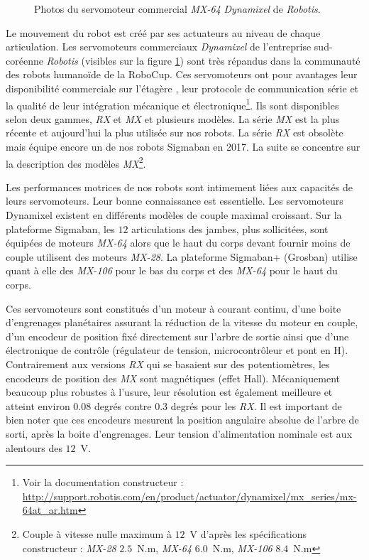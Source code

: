 \begin{figure}[htb]
\begin{subfigure}{0.3\paperwidth}
    \end{subfigure}
    \caption{\label{fig:robot_dynamixel} 
        Photos du servomoteur commercial \textit{MX-64} 
        \textit{Dynamixel} de \textit{Robotis}.
    }
\end{figure}

Le mouvement du robot est créé par ses actuateurs au niveau de chaque articulation.
Les servomoteurs commerciaux \textit{Dynamixel} de l'entreprise sud-coréenne \textit{Robotis} 
(visibles sur la figure \ref{fig:robot_dynamixel})
sont très répandus dans la communauté des robots humanoïde de la RoboCup.
Ces servomoteurs ont pour avantages leur disponibilité commerciale \og sur l'étagère \fg, 
leur protocole de communication série et la qualité de leur intégration mécanique
et électronique\footnote{Voir la documentation constructeur : 
\url{http://support.robotis.com/en/product/actuator/dynamixel/mx_series/mx-64at_ar.htm}}.
Ils sont disponibles selon deux gammes, \textit{RX} et \textit{MX} et plusieurs 
modèles.
La série \textit{MX} est la plus récente et aujourd'hui la plus utilisée sur nos robots.
La série \textit{RX} est obsolète mais équipe encore un de nos robots Sigmaban en 2017.
La suite se concentre sur la description 
des modèles \textit{MX}\footnote{Couple à vitesse nulle maximum 
à $12$~V d'après les spécifications constructeur : 
\textit{MX-28} $2.5$~N.m, \textit{MX-64} $6.0$~N.m, \textit{MX-106} $8.4$~N.m}.

Les performances motrices de nos robots sont intimement liées aux capacités 
de leurs servomoteurs. Leur bonne connaissance est essentielle.
Les servomoteurs Dynamixel existent en différents modèles de couple maximal croissant.
Sur la plateforme Sigmaban, les $12$ articulations des jambes, plus sollicitées, 
sont équipées de moteurs \textit{MX-64} alors que le haut du corps devant fournir moins
de couple utilisent des moteurs \textit{MX-28}.
La plateforme Sigmaban+ (Grosban) utilise quant à elle des \textit{MX-106} pour le bas du corps et
des \textit{MX-64} pour le haut du corps.

Ces servomoteurs sont constitués d'un moteur à courant continu, 
d'une boite d'engrenages planétaires assurant la réduction de la vitesse du moteur
en couple, d'un encodeur de position fixé directement sur l'arbre
de sortie ainsi que d'une électronique de contrôle (régulateur de tension,
microcontrôleur et pont en H).
Contrairement aux versions \textit{RX} qui se basaient sur des potentiomètres, 
les encodeurs de position des \textit{MX} sont magnétiques (effet Hall).
Mécaniquement beaucoup plus robustes à l'usure, leur résolution est également meilleure
et atteint environ $0.08$ degrés contre $0.3$ degrés pour les \textit{RX}.
Il est important de bien noter que ces encodeurs mesurent la position angulaire
absolue de l'arbre de sorti, après la boite d'engrenages.
Leur tension d'alimentation nominale est aux alentours des $12$~V.

